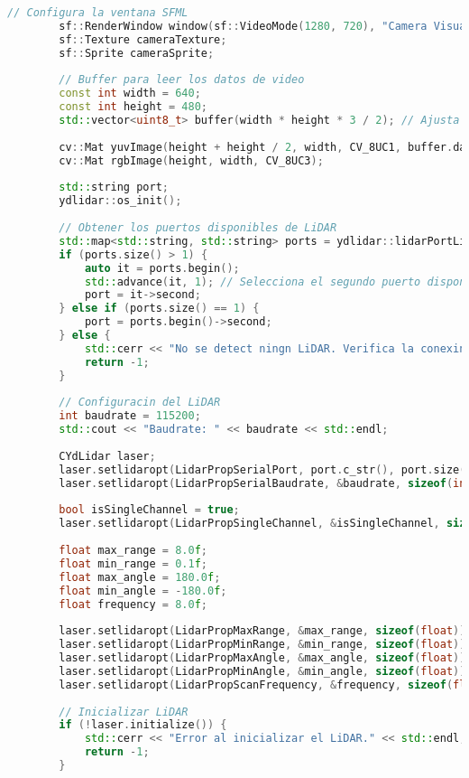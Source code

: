 \begin{lstlisting}[language={C++}, caption={Primer ajuste de c\'odigo}, label={Script}]
        // Configura la ventana SFML
        sf::RenderWindow window(sf::VideoMode(1280, 720), "Camera Visualization with LiDAR");
        sf::Texture cameraTexture;
        sf::Sprite cameraSprite;
    
        // Buffer para leer los datos de video
        const int width = 640;
        const int height = 480;
        std::vector<uint8_t> buffer(width * height * 3 / 2); // Ajusta el tamao del buffer para YUV420
    
        cv::Mat yuvImage(height + height / 2, width, CV_8UC1, buffer.data());
        cv::Mat rgbImage(height, width, CV_8UC3);
    
        std::string port;
        ydlidar::os_init();
    
        // Obtener los puertos disponibles de LiDAR
        std::map<std::string, std::string> ports = ydlidar::lidarPortList();
        if (ports.size() > 1) {
            auto it = ports.begin();
            std::advance(it, 1); // Selecciona el segundo puerto disponible
            port = it->second;
        } else if (ports.size() == 1) {
            port = ports.begin()->second;
        } else {
            std::cerr << "No se detect ningn LiDAR. Verifica la conexin." << std::endl;
            return -1;
        }
    
        // Configuracin del LiDAR
        int baudrate = 115200;
        std::cout << "Baudrate: " << baudrate << std::endl;
    
        CYdLidar laser;
        laser.setlidaropt(LidarPropSerialPort, port.c_str(), port.size());
        laser.setlidaropt(LidarPropSerialBaudrate, &baudrate, sizeof(int));
    
        bool isSingleChannel = true;
        laser.setlidaropt(LidarPropSingleChannel, &isSingleChannel, sizeof(bool));
    
        float max_range = 8.0f;
        float min_range = 0.1f;
        float max_angle = 180.0f;
        float min_angle = -180.0f;
        float frequency = 8.0f;
    
        laser.setlidaropt(LidarPropMaxRange, &max_range, sizeof(float));
        laser.setlidaropt(LidarPropMinRange, &min_range, sizeof(float));
        laser.setlidaropt(LidarPropMaxAngle, &max_angle, sizeof(float));
        laser.setlidaropt(LidarPropMinAngle, &min_angle, sizeof(float));
        laser.setlidaropt(LidarPropScanFrequency, &frequency, sizeof(float));
    
        // Inicializar LiDAR
        if (!laser.initialize()) {
            std::cerr << "Error al inicializar el LiDAR." << std::endl;
            return -1;
        }
    

\end{lstlisting}
